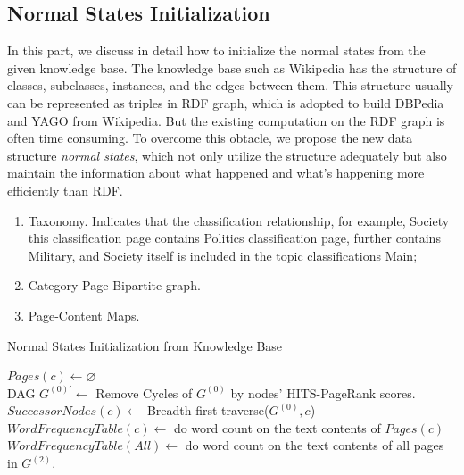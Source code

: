 \documentclass[conference,compsoc]{IEEEtran}
\begin{document}
\subsection{Normal States Initialization}
In this part, we discuss in detail how to initialize the normal states from the given knowledge base. 
The knowledge base such as Wikipedia has the structure of classes, subclasses, instances, and the edges between them. 
This structure usually can be represented as triples in RDF graph\cite{klyne2006rdf}, which is adopted to build DBPedia\cite{auer2007dbpedia} and YAGO\cite{suchanek2007yago} from Wikipedia.  
But the existing computation on the RDF graph is often time consuming. To overcome this obtacle, we propose the new data structure \textit{normal states}, which not only utilize the structure adequately but also maintain the information about what happened and what's happening more efficiently than RDF.  
\begin{enumerate}[labelindent=\parindent,leftmargin=*]
\item Taxonomy. Indicates that the classification relationship, for example, Society this classification page contains Politics classification page, further contains Military, and Society itself is included in the topic classifications Main;
\item Category-Page Bipartite graph.
\item Page-Content Maps.
\end{enumerate}



\begin{algorithm}
\caption{Normal States Initialization from Knowledge Base}
\label{alg:normalStatesInit}

\(Pages(c)\leftarrow \varnothing\)\\
DAG \(G^{(0)'} \leftarrow\) Remove Cycles of \(G^{(0)}\) by nodes' HITS-PageRank scores. \\
\(SuccessorNodes(c) \leftarrow \) Breadth-first-traverse(\(G^{(0)},c\))\\
\(WordFrequencyTable(c) \leftarrow \) do word count on the text contents of \(Pages(c)\) \\
\(WordFrequencyTable(All) \leftarrow \) do word count on the text contents of all pages in \(G^{(2)}\).\\
\end{algorithm}
\end{document}
